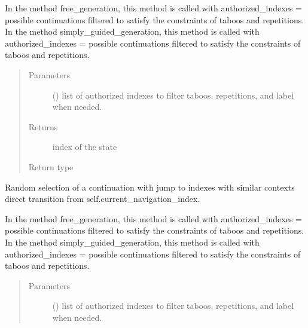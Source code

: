 \documentclass[letterpaper,10pt,english]{sphinxmanual}
\begin{document}
\begin{fulllineitems}
\begin{fulllineitems}
In the method free\_generation, this method is called with authorized\_indexes = possible continuations filtered to satisfy the constraints of taboos and repetitions.
In the method simply\_guided\_generation, this method is called with authorized\_indexes = possible continuations  filtered to satisfy the constraints of taboos and repetitions.
\begin{quote}\begin{description}
\item[{Parameters}] \leavevmode
{} (\sphinxstyleliteralemphasis{(}\sphinxstyleliteralemphasis{)}) \textendash{} list of authorized indexes to filter taboos, repetitions, and label when needed.

\item[{Returns}] \leavevmode
index of the state

\item[{Return type}] \leavevmode
{}

\end{description}\end{quote}

\end{fulllineitems}


\begin{fulllineitems}
\label{\detokenize{index:Model.FactorOracle.follow_continuation_with_jump}}
Random selection of a continuation with jump to indexes with similar contexts direct transition from self.current\_navigation\_index.

In the method free\_generation, this method is called with authorized\_indexes = possible continuations filtered to satisfy the constraints of taboos and repetitions.
In the method simply\_guided\_generation, this method is called with authorized\_indexes = possible continuations  filtered to satisfy the constraints of taboos and repetitions.
\begin{quote}\begin{description}
\item[{Parameters}] \leavevmode
{} (\sphinxstyleliteralemphasis{(}\sphinxstyleliteralemphasis{)}) \textendash{} list of authorized indexes to filter taboos, repetitions, and label when needed.


\end{description}
\end{quote}
\end{fulllineitems}
\end{fulllineitems}
\end{document}
